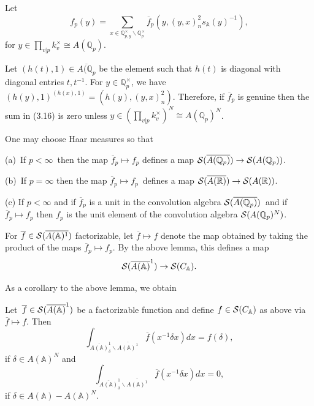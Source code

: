 Let 
\begin{equation}
f_p(y)=
\sum_{x\in {\mathbb{Q}}_{p,y}^\times
\backslash {\mathbb{Q}}_p^\times}
\overline{f}_p(y ,(y,x)_n^2s_{\mathbb{A}}(y)^{-1} ),
\end{equation}
for $y\in \prod_{v|p}k_v^\times\cong A({\mathbb{Q}}_p)$.

\begin{remark}
Let $(h(t),1)\in \overline{A({\mathbb{Q}}_p}$ be the element
such that $h(t)$ is diagonal with diagonal entries $t,t^{-1}$.
For $y\in {\mathbb{Q}}_p^\times$, we have
$(h(y),1)^{(h(x),1)}=
(h(y) ,(y,x)_n^2) $.
Therefore, if $\overline{f}_p$ is genuine then
the sum in (3.16) is zero unless
$y\in (\prod_{v|p}k_v^\times)^N\cong A({\mathbb{Q}}_p)^N$.
\end{remark}

\begin{lemma}
One may choose Haar measures so that

(a)\ If $p<\infty $\ then the map $\overline{f}_p\longmapsto f_p$
defines a map ${{\cal{S}}}(\overline{A({{\mathbb{Q}}}_p)})\rightarrow
{{\cal{S}}}(A({{\mathbb{Q}}}_p))$.

(b)\ If $p=\infty$ then the map
$\overline{f}_p\longmapsto f_p$\ defines a map
${{\cal{S}}}(\overline{A(\mathbb{R})})
\rightarrow {{\cal{S}}}(A({\mathbb{R}}))$.

(c) If $p<\infty $ and if $\overline{f}_p$
is a unit in the convolution
algebra ${\cal{S}}(\overline{A({\mathbb{Q}}_p)})$\ and
if $\overline{f}_p\longmapsto f_p$ then $f_p$
is the unit element of
the convolution algebra ${\cal{S}}(A({\mathbb{Q}}_p)^N)$.
\end{lemma}

For $\overline{f}\in {\cal{S}}(\overline{A({\mathbb{A}})^1})$
factorizable, let $\overline{f}\longmapsto f$ denote the map
obtained by taking the
product of the maps $\overline{f}_p\longmapsto f_p$.
By the above lemma, this defines a map 
\begin{equation}
{\cal{S}}(\overline{A({\mathbb{A}})}^1)\rightarrow {\cal{S}}(C_{{\mathbb{A}}}).
\end{equation}

As a corollary to the above lemma, we obtain

\begin{lemma}
Let\ $\overline{f}\in {\cal{S}}(\overline{A({\mathbb{A}})}^1)$ be a
factorizable function and define
$f\in {\cal{S}}(C_{\mathbb{A}})$ as above via
$\overline{f}\longmapsto f$. Then 
\[
\int_{\overline{A({\mathbb{A}})}_\delta ^1
\backslash \overline{A({\mathbb{A}})^1}}\overline{f}(x^{-1}\delta x)dx
=f(\delta ),
\]
if $\delta\in A({\mathbb{A}})^N$ and
\[
\int_{\overline{A({\mathbb{A}})}_\delta ^1
\backslash \overline{A({\mathbb{A}})^1}}\overline{f}(x^{-1}\delta x)dx
=0,
\]
if $\delta\in A({\mathbb{A}})-A({\mathbb{A}})^N$.
\end{lemma}

